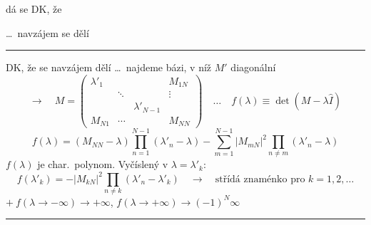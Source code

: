 \begin{minipage}{0.3\textwidth}
dá se DK, že
\end{minipage}
\begin{minipage}{0.4\textwidth}
\end{minipage}
\begin{minipage}{0.25\textwidth}
\dots\ navzájem se dělí
\end{minipage}

\noindent\rule{3cm}{0.4pt}

DK, že se navzájem dělí \dots\ najdeme bázi, v níž $M'$ diagonální
\[
  \to\quad M = \left(\begin{array}{ccc|c}
    \lambda'_1 & & & M_{1N} \\
    & \ddots & & \vdots \\
    & & \lambda'_{N-1} & \\ \hline
    M_{N1} & \cdots & & M_{NN}
  \end{array}\right)
  \quad\dots\quad
  f(\lambda) \equiv \det(M - \lambda\hat I)
\]
\[
  f(\lambda) = (M_{NN} - \lambda)\prod_{n=1}^{N-1}(\lambda'_n - \lambda) - \sum_{m=1}^{N-1}|M_{mN}|^2\prod_{n\neq m}(\lambda'_n - \lambda)
\]
$f(\lambda)$ je char.\ polynom. Vyčíslený v $\lambda = \lambda'_k$:
\[
  f(\lambda'_k) = -|M_{kN}|^2\prod_{n\neq k}(\lambda'_n - \lambda'_k)
  \quad\to\quad \text{střídá znaménko pro } k = 1,2,\dots
\]
\hfill $+\ f(\lambda\to-\infty)\to+\infty$, \quad $f(\lambda\to+\infty)\to(-1)^N\infty$

\noindent\rule{3cm}{0.4pt}

